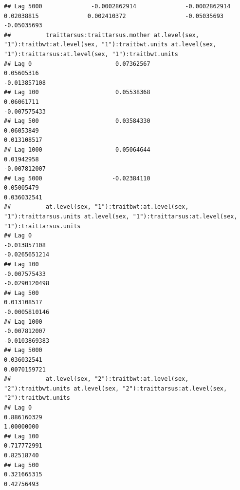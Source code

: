 \documentclass[
  12pt,
]{book}
\begin{document}
\begin{verbatim}
## Lag 5000              -0.0002862914              -0.0002862914                    0.02038815              0.002410372                 -0.05035693                 -0.05035693
##          traittarsus:traittarsus.mother at.level(sex, "1"):traitbwt:at.level(sex, "1"):traitbwt.units at.level(sex, "1"):traittarsus:at.level(sex, "1"):traitbwt.units
## Lag 0                        0.07362567                                                    0.05605316                                                     -0.013857108
## Lag 100                      0.05538368                                                    0.06061711                                                     -0.007575433
## Lag 500                      0.03584330                                                    0.06053849                                                      0.013108517
## Lag 1000                     0.05064644                                                    0.01942958                                                     -0.007812007
## Lag 5000                    -0.02384110                                                    0.05005479                                                      0.036032541
##          at.level(sex, "1"):traitbwt:at.level(sex, "1"):traittarsus.units at.level(sex, "1"):traittarsus:at.level(sex, "1"):traittarsus.units
## Lag 0                                                        -0.013857108                                                       -0.0265651214
## Lag 100                                                      -0.007575433                                                       -0.0290120498
## Lag 500                                                       0.013108517                                                       -0.0005810146
## Lag 1000                                                     -0.007812007                                                       -0.0103869383
## Lag 5000                                                      0.036032541                                                        0.0070159721
##          at.level(sex, "2"):traitbwt:at.level(sex, "2"):traitbwt.units at.level(sex, "2"):traittarsus:at.level(sex, "2"):traitbwt.units
## Lag 0                                                      0.886160329                                                       1.00000000
## Lag 100                                                    0.717772991                                                       0.82518740
## Lag 500                                                    0.321665315                                                       0.42756493

\end{verbatim}
\end{document}
